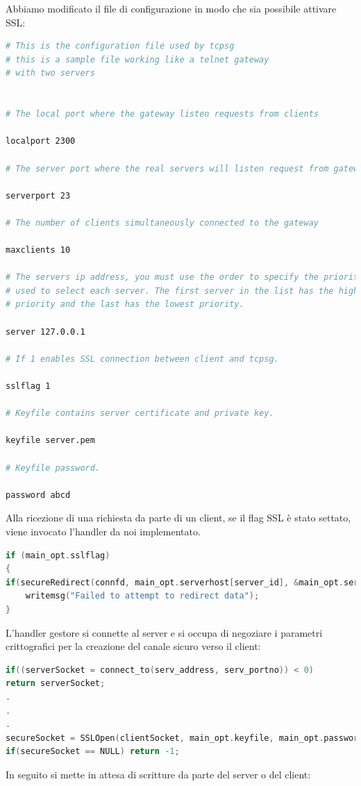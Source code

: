 \documentclass[10pt]{article}  %
\begin{document}
        Abbiamo modificato il file di configurazione in modo che sia possibile attivare SSL:
        \begin{lstlisting}[language=Bash]
# This is the configuration file used by tcpsg
# this is a sample file working like a telnet gateway
# with two servers


# The local port where the gateway listen requests from clients

localport 2300

# The server port where the real servers will listen request from gateway

serverport 23

# The number of clients simultaneously connected to the gateway

maxclients 10

# The servers ip address, you must use the order to specify the priority
# used to select each server. The first server in the list has the highest
# priority and the last has the lowest priority.

server 127.0.0.1

# If 1 enables SSL connection between client and tcpsg.

sslflag 1

# Keyfile contains server certificate and private key.

keyfile server.pem

# Keyfile password.

password abcd
        \end{lstlisting}
        Alla ricezione di una richiesta da parte di un client, se il flag SSL è stato settato,
        viene invocato l'handler da noi implementato.
        \begin{lstlisting}[language=C]
if (main_opt.sslflag)
{
if(secureRedirect(connfd, main_opt.serverhost[server_id], &main_opt.serverport) < 0)
    writemsg("Failed to attempt to redirect data");
}
        \end{lstlisting}
        L'handler gestore si connette al server e si occupa di negoziare i parametri crittografici per la creazione
        del canale sicuro verso il client:
        \begin{lstlisting}[language=C]
if((serverSocket = connect_to(serv_address, serv_portno)) < 0)
return serverSocket;
.
.
.
secureSocket = SSLOpen(clientSocket, main_opt.keyfile, main_opt.password, NULL);
if(secureSocket == NULL) return -1;
        \end{lstlisting}
        In seguito si mette in attesa di scritture da parte del server o del client:
\end{document}
